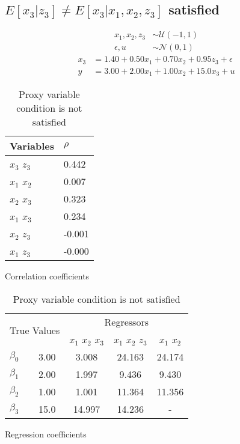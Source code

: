 \subsection{$E[x_3 | z_3] \neq E[x_3 | x_1 ,x_2 , z_3]$ satisfied}
\begin{align*}
 x_1 , x_2 , z_3 &\sim \mathcal{U}(-1 , 1)\\
\epsilon , u &\sim \mathcal{N}(0 , 1) 
\end{align*}
\begin{align*}
    x_3 &= 1.40 + 0.50 x_1 + 0.70 x_2 + 0.95 z_3 + \epsilon\\
    y   &= 3.00 + 2.00 x_1 + 1.00 x_2 + 15.0 x_3 + u
\end{align*}

\begin{table}[htbp]
    \begin{minipage}[t]{0.42\textwidth}
        \centering
        \begin{tabular}{ll}
            \toprule
            Variables & $\rho$ \\
            \midrule
            $x_3$ $z_3$ & 0.442 \\
            $x_1$ $x_2$ & 0.007 \\
            \hline
            $x_2$ $x_3$ & 0.323 \\
            $x_1$ $x_3$ & 0.234 \\
            \hline
            $x_2$ $z_3$ & -0.001 \\
            $x_1$ $z_3$ & -0.000 \\
            \bottomrule
        \end{tabular}
        \caption{Correlation coefficients}
        \label{tab:no_proxy_corr}
        
    \end{minipage}%
    \hspace{0.0\textwidth}
    \begin{minipage}[t]{0.42\textwidth}
        \centering
        \begin{tabular}{lcccc} %
            \toprule
            \multicolumn{2}{c}{\multirow{2}{*}{True Values}} & \multicolumn{3}{c}{Regressors} \\
            \cmidrule(lr){3-5}
            \multicolumn{2}{c}{} & $x_1$ $x_2$ $x_3$ & $x_1$ $x_2$ $z_3$ & $x_1$ $x_2$ \\
            \midrule
            $\beta_0$ & 3.00 & 3.008 & 24.163 & 24.174 \\
            $\beta_1$ & 2.00 & 1.997 & 9.436 & 9.430 \\
            $\beta_2$ & 1.00 & 1.001 & 11.364 & 11.356 \\
            $\beta_3$ & 15.0 & 14.997 & 14.236 & - \\
            \bottomrule
        \end{tabular}
        \caption{Regression coefficients}
          \label{tab:no_proxy_data}
        
    \end{minipage}
    \caption{Proxy variable condition is not satisfied}
\end{table}

